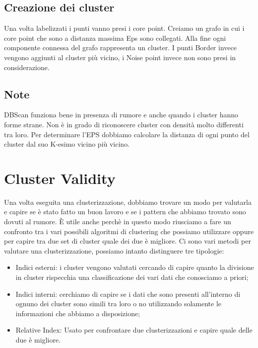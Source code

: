 \documentclass[14pt]{extreport}
\begin{document}
\section{Creazione dei cluster}

Una volta labelizzati i punti vanno presi i core point. 
Creiamo un grafo in cui i core point che sono a distanza massima Eps sono collegati.
Alla fine ogni componente connessa del grafo rappresenta un cluster.
I punti Border invece vengono aggiunti al cluster più vicino, i Noise point invece non sono presi in considerazione.


\section{Note}

DBScan funziona bene in presenza di rumore e anche quando i cluster hanno forme strane. 
Non è in grado di riconoscere cluster con densità molto differenti tra loro.
Per determinare l'EPS dobbiamo calcolare la distanza di ogni punto del cluster dal suo K-esimo vicino più vicino.

\chapter{Cluster Validity}

Una volta eseguita una clusterizzazione, dobbiamo trovare un modo per valutarla e capire se è stato fatto un buon lavoro e se i pattern che abbiamo trovato sono dovuti al rumore. È utile anche perchè in questo modo riusciamo a fare un confronto tra i vari possibili algoritmi di clustering che possiamo utilizzare oppure per capire tra due set di cluster quale dei due è migliore.
Ci sono vari metodi per valutare una clusterizzazione, possiamo intanto distinguere tre tipologie:

\begin{itemize}
    \item Indici esterni: i cluster vengono valutati cercando di capire quanto la divisione in cluster rispecchia una classificazione dei vari dati che conosciamo a priori;
    \item Indici interni: cerchiamo di capire se i dati che sono presenti all'interno di ognuno dei cluster sono simili tra loro o no utilizzando solamente le informazioni che abbiamo a disposizione;
    \item Relative Index: Usato per confrontare due clusterizzazioni e capire quale delle due è migliore.
\end{itemize}
\end{document}
